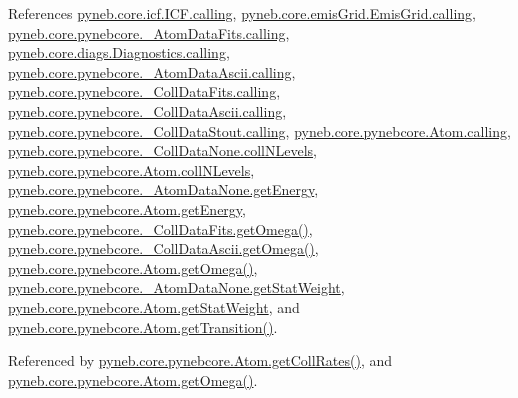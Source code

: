 References \hyperlink{icf_8py_source_l00016}{pyneb.\-core.\-icf.\-I\-C\-F.\-calling}, \hyperlink{emis_grid_8py_source_l00044}{pyneb.\-core.\-emis\-Grid.\-Emis\-Grid.\-calling}, \hyperlink{pynebcore_8py_source_l00097}{pyneb.\-core.\-pynebcore.\-\_\-\-Atom\-Data\-Fits.\-calling}, \hyperlink{diags_8py_source_l00169}{pyneb.\-core.\-diags.\-Diagnostics.\-calling}, \hyperlink{pynebcore_8py_source_l00318}{pyneb.\-core.\-pynebcore.\-\_\-\-Atom\-Data\-Ascii.\-calling}, \hyperlink{pynebcore_8py_source_l00585}{pyneb.\-core.\-pynebcore.\-\_\-\-Coll\-Data\-Fits.\-calling}, \hyperlink{pynebcore_8py_source_l00936}{pyneb.\-core.\-pynebcore.\-\_\-\-Coll\-Data\-Ascii.\-calling}, \hyperlink{pynebcore_8py_source_l01156}{pyneb.\-core.\-pynebcore.\-\_\-\-Coll\-Data\-Stout.\-calling}, \hyperlink{pynebcore_8py_source_l01229}{pyneb.\-core.\-pynebcore.\-Atom.\-calling}, \hyperlink{pynebcore_8py_source_l00080}{pyneb.\-core.\-pynebcore.\-\_\-\-Coll\-Data\-None.\-coll\-N\-Levels}, \hyperlink{pynebcore_8py_source_l01289}{pyneb.\-core.\-pynebcore.\-Atom.\-coll\-N\-Levels}, \hyperlink{pynebcore_8py_source_l00066}{pyneb.\-core.\-pynebcore.\-\_\-\-Atom\-Data\-None.\-get\-Energy}, \hyperlink{pynebcore_8py_source_l01256}{pyneb.\-core.\-pynebcore.\-Atom.\-get\-Energy}, \hyperlink{pynebcore_8py_source_l00828}{pyneb.\-core.\-pynebcore.\-\_\-\-Coll\-Data\-Fits.\-get\-Omega()}, \hyperlink{pynebcore_8py_source_l01082}{pyneb.\-core.\-pynebcore.\-\_\-\-Coll\-Data\-Ascii.\-get\-Omega()}, \hyperlink{pynebcore_8py_source_l01324}{pyneb.\-core.\-pynebcore.\-Atom.\-get\-Omega()}, \hyperlink{pynebcore_8py_source_l00065}{pyneb.\-core.\-pynebcore.\-\_\-\-Atom\-Data\-None.\-get\-Stat\-Weight}, \hyperlink{pynebcore_8py_source_l01255}{pyneb.\-core.\-pynebcore.\-Atom.\-get\-Stat\-Weight}, and \hyperlink{pynebcore_8py_source_l01472}{pyneb.\-core.\-pynebcore.\-Atom.\-get\-Transition()}.



Referenced by \hyperlink{pynebcore_8py_source_l01394}{pyneb.\-core.\-pynebcore.\-Atom.\-get\-Coll\-Rates()}, and \hyperlink{pynebcore_8py_source_l01324}{pyneb.\-core.\-pynebcore.\-Atom.\-get\-Omega()}.


